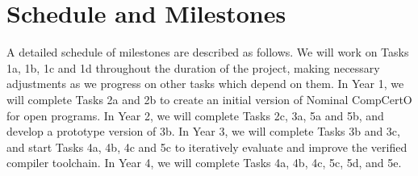 \section{Schedule and Milestones}

A detailed schedule of milestones are described as follows.
We will work on Tasks 1a, 1b, 1c and 1d throughout the duration of the project,
making necessary adjustments as we progress on other tasks
which depend on them.
In Year 1, 
we will complete Tasks 2a and 2b to
create an initial version of Nominal CompCertO for open programs.
In Year 2, we will complete Tasks 2c, 3a, 5a and 5b, and
develop a prototype version of 3b.
In Year 3, 
we will complete Tasks 3b and 3c, and start Tasks 4a, 4b, 4c and 5c to
iteratively evaluate and improve the verified compiler toolchain.
In Year 4, we will complete Tasks 4a, 4b, 4c, 5c, 5d, and 5e.


